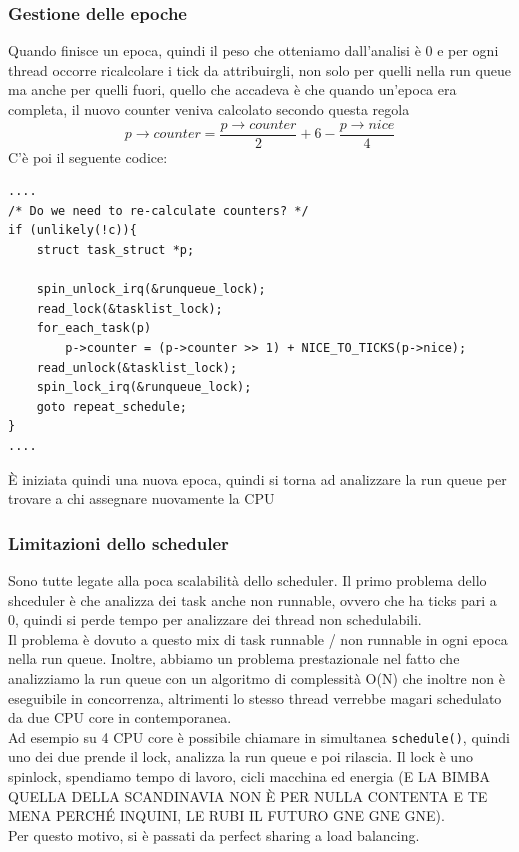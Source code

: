 \documentclass[12pt, oneside]{extbook}
\begin{document}
\subsubsection{Gestione delle epoche}
Quando finisce un epoca, quindi il peso che otteniamo dall'analisi è 0 e per ogni thread occorre ricalcolare i tick da attribuirgli, non solo per quelli nella run queue ma anche per quelli fuori, quello che accadeva è che quando un'epoca era completa, il nuovo counter veniva calcolato secondo questa regola
\begin{equation}
p \rightarrow counter = \frac{p \rightarrow counter}{2} + 6 - \frac{p \rightarrow nice}{4}
\end{equation}
C'è poi il seguente codice:
\begin{lstlisting}
....
/* Do we need to re-calculate counters? */
if (unlikely(!c)){
	struct task_struct *p;
	
	spin_unlock_irq(&runqueue_lock);
	read_lock(&tasklist_lock);
	for_each_task(p)
		p->counter = (p->counter >> 1) + NICE_TO_TICKS(p->nice);
	read_unlock(&tasklist_lock);
	spin_lock_irq(&runqueue_lock);
	goto repeat_schedule;
}
....
\end{lstlisting}
È iniziata quindi una nuova epoca, quindi si torna ad analizzare la run queue per trovare a chi assegnare nuovamente la CPU
\subsubsection{Limitazioni dello scheduler}
Sono tutte legate alla poca scalabilità dello scheduler. Il primo problema dello shceduler è che analizza dei task anche non runnable, ovvero che ha ticks pari a 0, quindi si perde tempo per analizzare dei thread non schedulabili.\\Il problema è dovuto a questo mix di task runnable / non runnable in ogni epoca nella run queue. Inoltre, abbiamo un problema prestazionale nel fatto che analizziamo la run queue con un algoritmo di complessità O(N) che inoltre non è eseguibile in concorrenza, altrimenti lo stesso thread verrebbe magari schedulato da due CPU core in contemporanea.\\Ad esempio su 4 CPU core è possibile chiamare in simultanea \texttt{schedule()}, quindi uno dei due prende il lock, analizza la run queue e poi rilascia. Il lock è uno spinlock, spendiamo tempo di lavoro, cicli macchina ed energia (E LA BIMBA QUELLA DELLA SCANDINAVIA NON È PER NULLA CONTENTA E TE MENA PERCHÉ INQUINI, LE RUBI IL FUTURO GNE GNE GNE).\\Per questo motivo, si è passati da perfect sharing a load balancing.
\end{document}
